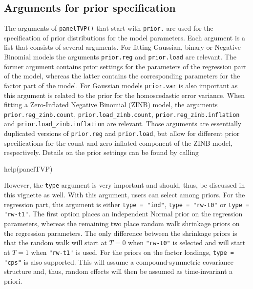 \documentclass[a4paper, preprint, 3p,
authoryear]{elsarticle} %
\newenvironment{Shaded}{\begin{snugshade}}{\end{snugshade}}
\newcommand{\NormalTok}[1]{#1}
\begin{document}
\subsection{Arguments for prior
specification}\label{arguments-for-prior-specification}

The arguments of \texttt{panelTVP()} that start with \texttt{prior.} are
used for the specification of prior distributions for the model
parameters. Each argument is a list that consists of several arguments.
For fitting Gaussian, binary or Negative Binomial models the arguments
\texttt{prior.reg} and \texttt{prior.load} are relevant. The former
argument contains prior settings for the parameters of the regression
part of the model, whereas the latter contains the corresponding
parameters for the factor part of the model. For Gaussian models
\texttt{prior.var} is also important as this argument is related to the
prior for the homoscedastic error variance. When fitting a Zero-Inflated
Negative Binomial (ZINB) model, the arguments
\texttt{prior.reg\_zinb.count}, \texttt{prior.load\_zinb.count},
\texttt{prior.reg\_zinb.inflation} and
\texttt{prior.load\_zinb.inflation} are relevant. Those arguments are
essentially duplicated versions of \texttt{prior.reg} and
\texttt{prior.load}, but allow for different prior specifications for
the count and zero-inflated component of the ZINB model, respectively.
Details on the prior settings can be found by calling

\begin{Shaded}
\begin{Highlighting}[]
\NormalTok{help(panelTVP)}
\end{Highlighting}
\end{Shaded}

However, the \texttt{type} argument is very important and should, thus,
be discussed in this vignette as well. With this argument, users can
select among priors. For the regression part, this argument is either
\texttt{type = "ind"}, \texttt{type = "rw-t0"} or
\texttt{type = "rw-t1"}. The first option places an independent Normal
prior on the regression parameters, whereas the remaining two place
random walk shrinkage priors on the regression parameters. The only
difference between the shrinkage priors is that the random walk will
start at \(T=0\) when \texttt{"rw-t0"} is selected and will start at
\(T=1\) when \texttt{"rw-t1"} is used. For the priors on the factor
loadings, \texttt{type = "cps"} is also supported. This will assume a
compound-symmetric covariance structure and, thus, random effects will
then be assumed as time-invariant a priori.
\end{document}
